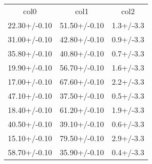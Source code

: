 \begin{table}
\begin{tabular}{ccc}
col0 & col1 & col2 \\
22.30+/-0.10 & 51.50+/-0.10 & 1.3+/-3.3 \\
31.00+/-0.10 & 42.80+/-0.10 & 0.9+/-3.3 \\
35.80+/-0.10 & 40.80+/-0.10 & 0.7+/-3.3 \\
19.90+/-0.10 & 56.70+/-0.10 & 1.6+/-3.3 \\
17.00+/-0.10 & 67.60+/-0.10 & 2.2+/-3.3 \\
47.10+/-0.10 & 37.50+/-0.10 & 0.5+/-3.3 \\
18.40+/-0.10 & 61.20+/-0.10 & 1.9+/-3.3 \\
40.50+/-0.10 & 39.10+/-0.10 & 0.6+/-3.3 \\
15.10+/-0.10 & 79.50+/-0.10 & 2.9+/-3.3 \\
58.70+/-0.10 & 35.90+/-0.10 & 0.4+/-3.3 \\
\end{tabular}
\end{table}
